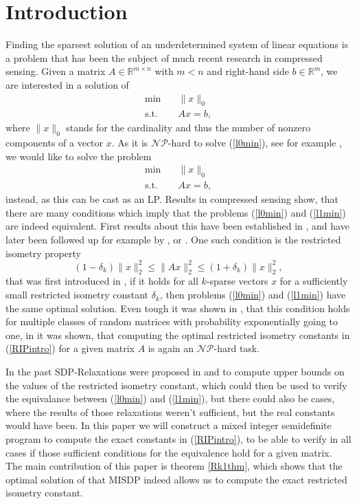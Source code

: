 \documentclass[a4paper,11pt,1p]{elsarticle}
\newcommand{\R}{\mathds{R}}
\begin{document}
\section{Introduction}
Finding the sparsest solution of an underdetermined system of linear equations is a problem that has been the subject of much recent research in compressed sensing. Given a matrix $A \in \R^{m \times n}$ with $m < n$ and 
right-hand side $b \in \R^m$, we are interested in a solution of 
\begin{align}\label{l0min}
 \text{min} \quad & \|x\|_0 \\
 \text{s.t.} \quad & Ax = b, \nonumber
\end{align}
where $\|x\|_0$ stands for the cardinality and thus the number of nonzero components of a vector $x$. As it is $\mathcal{NP}$-hard to solve (\ref{l0min}), see for example \cite{GareyJohnson}, we would like to solve the problem
\begin{align}\label{l1min}
 \text{min} \quad & \|x\|_0 \\
 \text{s.t.} \quad & Ax = b, \nonumber
\end{align}
instead, as this can be cast as an LP. Results in compressed sensing show, that there are many conditions which imply that the problems (\ref{l0min}) and (\ref{l1min}) are indeed equivalent. First results about this have been 
established in \cite{DH01}, and have later been followed up for example by \cite{CRT05}, \cite{Zha08} or \cite{BCT11}. One such condition is the restricted isometry property
\begin{equation}\label{RIPintro}
 (1-\delta_k)\|x\|_2^2 \leq \|Ax\|_2^2 \leq (1+\delta_k)\|x\|_2^2,
\end{equation}
that was first introduced in \cite{CT05}, if it holds for all $k$-sparse vectors $x$ for a sufficiently small restricted isometry constant $\delta_k$, then problems (\ref{l0min}) and (\ref{l1min}) have the same optimal solution. 
Even tough it was shown in \cite{BDDW08}, that this condition holds for multiple classes of random matrices with probability exponentially going to one, in \cite{PT14} it was shown, that computing the optimal restricted isometry 
constants in (\ref{RIPintro}) for a given matrix $A$ is again an
$\mathcal{NP}$-hard task.

In the past SDP-Relaxations were proposed in \cite{Asp07} and \cite{Asp08} to compute upper bounds on the values of the restricted isometry 
constant, which could then be used to verify the equivalance between (\ref{l0min}) and (\ref{l1min}), but there could also be cases, where the results of those relaxations weren't sufficient, but the real constants would have been. 
In this paper we will construct a mixed integer semidefinite program to compute the exact constants in (\ref{RIPintro}), to be able to verify in all cases if those sufficient conditions for the equivalence hold for a given matrix. 
The main contribution of this paper is theorem \ref{Rk1thm}, which shows
that the optimal solution of that MISDP indeed allows us to compute the
exact restricted isometry constant.
\end{document}
